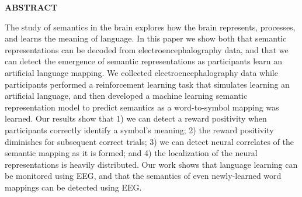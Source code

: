 \newpage
{}

\begin{center}
\textbf{ABSTRACT}
\end{center}

The study of semantics in the brain explores how the brain represents, processes, and learns the meaning of language. In this paper we show both that semantic representations can be decoded from electroencephalography data, and that we can detect the emergence of semantic representations as participants learn an artificial language mapping. We collected electroencephalography data while participants performed a reinforcement learning task that simulates learning an artificial language, and then developed a machine learning semantic representation model to predict semantics as a word-to-symbol mapping was learned. Our results show that 1) we can detect a reward positivity when participants correctly identify a symbol's meaning; 2) the reward positivity diminishes for subsequent correct trials; 3) we can detect neural correlates of the semantic mapping as it is formed; and 4) the localization of the neural representations is heavily distributed. Our work shows that language learning can be monitored using EEG, and that the semantics of even newly-learned word mappings can be detected using EEG.
